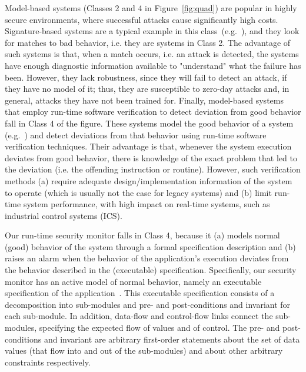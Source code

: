 \documentclass[conference]{IEEEtran}
\begin{document}
Model-based systems (Classes 2 and 4 in Figure~\ref{fig:quad}) are
popular in highly secure environments, where successful attacks cause
significantly high costs. 
Signature-based systems are a typical 
example in this class~(e.g.~\cite{Vern:1998, Martin:1999}), and 
they look for matches to bad behavior, i.e. they are systems in Class 2.
The advantage of such systems is that, when
a match occurs, i.e. an attack is detected, the systems have enough
diagnostic information available to "understand" what the failure 
has been.
However, they lack robustness, since they will fail to detect an attack,
if they have no model of it; thus, they are susceptible to zero-day
attacks and, in general, attacks they have not been trained for. 
Finally, model-based systems that employ run-time software
verification to detect deviation from good behavior fall in Class 4 
of the figure. These systems model the good behavior of a system 
(e.g.~\cite{Watterson:2007, Zhang:2008}) and detect deviations from
that behavior using run-time software verification techniques. 
Their advantage is that, whenever the system execution deviates from
good behavior, there is knowledge of the exact problem that led to
the deviation (i.e. the offending instruction or routine). However,
such verification methods (a) require adequate design/implementation
information of the system to operate (which is usually not the case 
for legacy systems) and (b) limit run-time system performance, with
high impact on real-time systems, such as industrial control systems
(ICS).

Our run-time security monitor falls in Class 4, because it (a) models
normal (good) behavior of the system through a formal specification description 
and (b) raises an alarm when the behavior of the application's
execution deviates from the behavior described in the (executable) specification. Specifically, our security monitor has an active model of normal behavior, namely an executable specification of the application~\cite{Shrobe:2006}. This executable specification consists of a decomposition into sub-modules and pre- and post-conditions and invariant for each sub-module. In addition, data-flow and control-flow links connect the sub-modules, specifying the expected flow of values and of control. The pre- and post-conditions and invariant are arbitrary first-order statements about the set of data values (that flow into and out of the sub-modules) and about other arbitrary constraints respectively. 
\end{document}
